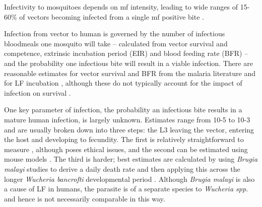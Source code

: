 Infectivity to mosquitoes depends on mf intensity, leading to wide ranges of 15-60\% of vectors becoming infected from a single mf positive bite \cite{Subramanian1998,gambhir2008}.

Infection from vector to human is governed by the number of infectious bloodmeals one mosquito will take – calculated from vector survival and competence, extrinsic incubation period (EIR) and blood feeding rate (BFR) – and the probability one infectious bite will result in a viable infection. There are reasonable estimates for vector survival and BFR from the malaria literature \cite{Killeen2000,Gary2001} and for LF incubation \cite{erickson2009}, although these do not typically account for the impact of infection on survival \cite{Subramanian1998}. 

One key parameter of infection, the probability an infectious bite results in a mature human infection, is largely unknown. Estimates range from 10-5 to 10-3 \cite{Hairston1968,Jones2014} and are usually broken down into three steps: the L3 leaving the vector, entering the host and developing to fecundity. The first is relatively straightforward to measure \cite{deMeillon1997}, although poses ethical issues, and the second can be estimated using mouse models \cite{Ho1967,Ewert1967}. The third is harder; best estimates are calculated by using \textit{Brugia malayi} studies to derive a daily death rate and then applying this across the longer \textit{Wucheria bancrofti} developmental period \cite{Norman2000_epifil,Addiss2000}. Although \textit{Brugia malayi} is also a cause of LF in humans, the parasite is of a separate species to \textit{Wucheria spp.} and hence is not necessarily comparable in this way. 


